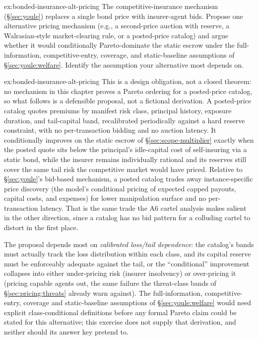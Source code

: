 \documentclass[11pt,a4paper]{article}
\theoremstyle{definition}
\theoremstyle{remark}
\begin{document}
\begin{pdexercise}[kind=Open,rating=3]{ex:bonded-insurance-alt-pricing}
The competitive-insurance mechanism (\S\ref{sec:youle}) replaces a single bond price with insurer-agent bids. Propose one alternative pricing mechanism (e.g., a second-price auction with reserve, a Walrasian-style market-clearing rule, or a posted-price catalog) and argue whether it would conditionally Pareto-dominate the static escrow under the full-information, competitive-entry, coverage, and static-baseline assumptions of \S\ref{sec:youle:welfare}. Identify the assumption your alternative most depends on.
\end{pdexercise}
\begin{pdsolution}{ex:bonded-insurance-alt-pricing}
This is a design obligation, not a closed theorem: no mechanism in this chapter proves a Pareto ordering for a posted-price catalog, so what follows is a defensible proposal, not a fictional derivation. A posted-price catalog quotes premiums by manifest risk class, principal history, exposure duration, and tail-capital band, recalibrated periodically against a hard reserve constraint, with no per-transaction bidding and no auction latency. It conditionally improves on the static escrow of \S\ref{sec:scope-multiplier} exactly when the posted quote sits below the principal's idle-capital cost of self-insuring via a static bond, while the insurer remains individually rational and its reserves still cover the same tail risk the competitive market would have priced. Relative to \S\ref{sec:youle}'s bid-based mechanism, a posted catalog trades away instance-specific price discovery (the model's conditional pricing of expected capped payouts, capital costs, and expenses) for lower manipulation surface and no per-transaction latency. That is the same trade the A6 cartel analysis makes salient in the other direction, since a catalog has no bid pattern for a colluding cartel to distort in the first place.

The proposal depends most on \emph{calibrated loss/tail dependence}: the catalog's bands must actually track the loss distribution within each class, and its capital reserve must be enforceably adequate against the tail, or the ``conditional'' improvement collapses into either under-pricing risk (insurer insolvency) or over-pricing it (pricing capable agents out, the same failure the threat-class bands of \S\ref{sec:pricing:threats} already warn against). The full-information, competitive-entry, coverage and static-baseline assumptions of \S\ref{sec:youle:welfare} would need explicit class-conditional definitions before any formal Pareto claim could be stated for this alternative; this exercise does not supply that derivation, and neither should its answer key pretend to.
\end{pdsolution}
\end{document}
